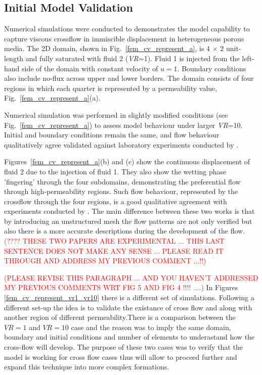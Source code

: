 \documentclass[preprint,authoryear,12pt]{elsarticle}
\newcommand{\red}{\textcolor{red}}
\begin{document}
\subsection{Initial Model Validation}\label{section:results_validation}
  
\medskip
Numerical simulations \citep[based on lab experiments due to][]{evans_1994,dawe_2008} were conducted to demonstrates the model capability to capture viscous crossflow in immiscible displacement in heterogeneous porous media. The 2D domain, shown in Fig.~\ref{fem_cv_represent_a}, is $4$ $\times$ $2$ unit-length and fully saturated with fluid 2 ({\it VR}=1). Fluid 1 is injected from the left-hand side of the domain with constant velocity of $u=1$. Boundary conditions also include no-flux across upper and lower borders. The domain consists of four regions in which each quarter is represented by a permeability value, Fig.~\ref{fem_cv_represent_a}(a).

Numerical simulation was performed in slightly modified conditions (see Fig.~\ref{fem_cv_represent_a}) to assess model behaviour under larger {\it VR}=10. Initial and boundary conditions remain the same, and flow behaviour qualitatively agree validated against laboratory experiments conducted by \citet{evans_1994}.

Figures~\ref{fem_cv_represent_a}(b) and (c) show the continuous displacement of fluid 2 due to the injection of fluid 1. They also show the wetting phase 'fingering' through the four subdomains, demonstrating the preferential flow through high-permeability regions. Such flow behaviour, represented by the crossflow through the four regions, is a good qualitative agreement with experiments conducted by \citet{dawe_2008}. The main difference between these two works is that by introducing an unstructured mesh the flow patterns are not only verified but also there is a more accurate descriptions during the development of the flow. \red{(???? THESE TWO PAPERS ARE EXPERIMENTAL ... THIS LAST SENTENCE DOES NOT MAKE ANY SENSE ... PLEASE READ IT THROUGH AND ADDRESS MY PREVIOUS COMMENT ...!!)} 

\red{(PLEASE REVISE THIS PARAGRAPH ... AND YOU HAVEN'T ADDRESSED MY PREVIOUS COMMENTS WRT FIG 5 AND FIG 4 !!!! ....)}
In Figures \ref{fem_cv_represent_vr1_vr10} there is a different set of simulations. Following a different set-up the idea is to validate the existance of cross flow and along with another region of different permeability.There is a comparison between the $VR=1$ and $VR=10$ case and the reason was to imply the same domain, boundary and initial conditions and number of elements to underastand how the cross-flow will develop. The purpose of these two cases was to verify that the model is working for cross flow cases thus will allow to proceed further and expand this technique into more complex formations.    
 
\end{document}
